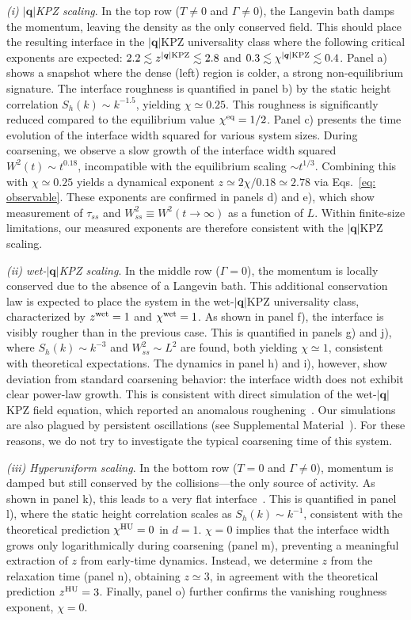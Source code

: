 \documentclass[aps,
reprint,
superscriptaddress,









amsmath,amssymb,floatfix,






prl
]{revtex4-2}
\begin{document}
\textit{(i) $|\bm q|$KPZ scaling}. In the top row ($T\neq 0$ and $\Gamma \neq 0$), the Langevin bath damps the momentum, leaving the density as the only conserved field. This should place the resulting interface in the $|\bm q|$KPZ universality class where the following critical exponents are expected: $2.2 \lesssim z^{|\bm q|\rm KPZ} \lesssim 2.8$ and $0.3 \lesssim \chi^{|\bm q|\rm KPZ} \lesssim 0.4$. Panel a) shows a snapshot where the dense (left) region is colder, a strong non-equilibrium signature. The interface roughness is quantified in panel b) by the static height correlation $S_h(k)\sim k^{-1.5}$, yielding $\chi\simeq0.25$. This roughness is significantly reduced compared to the equilibrium value $\chi^{\rm eq} = 1/2$. Panel c) presents the time evolution of the interface width squared for various system sizes. During coarsening, we observe a slow growth of the interface width squared $W^2(t)\sim t^{0.18}$, incompatible with the equilibrium scaling $\sim t^{1/3}$. Combining this with $\chi\simeq 0.25$ yields a dynamical exponent $z \simeq 2\chi/0.18 \simeq 2.78$ via Eqs.~\eqref{eq: observable}. These exponents are confirmed in panels d) and e), which show measurement of $\tau_{ss}$ and $W_{ss}^2\equiv W^2(t\to\infty)$ as a function of $L$. Within finite-size limitations, our measured exponents are therefore consistent with the $|\bm q|$KPZ scaling.

\textit{(ii) wet-$|\bm q|$KPZ scaling}. In the middle row ($\Gamma = 0$), the momentum is locally conserved due to the absence of a Langevin bath. This additional conservation law is expected to place the system in the wet-$|\bm q|$KPZ universality class, characterized by $z^{\rm wet}=1$ and $\chi^{\rm wet}=1$. As shown in panel f), the interface is visibly rougher than in the previous case. This is quantified in panels g) and j), where $S_h(k)\sim k^{-3}$ and $W_{ss}^2 \sim L^2$ are found, both yielding $\chi \simeq 1$, consistent with theoretical expectations. The dynamics in panel h) and i), however, show deviation from standard coarsening behavior: the interface width does not exhibit clear power-law growth. This is consistent with direct simulation of the wet-$|\bm q|$KPZ field equation, which reported an anomalous roughening~\cite{caballero2024interface}. Our simulations are also plagued by persistent oscillations (see Supplemental Material~\cite{supp}). For these reasons, we do not try to investigate the typical coarsening time of this system.

\textit{(iii) Hyperuniform scaling}. In the bottom row ($T=0$ and $\Gamma\neq0$), momentum is damped but still conserved by the collisions---the only source of activity. As shown in panel k), this leads to a very flat interface~\cite{maire2025hyperuniform}. This is quantified in panel l), where the static height correlation scales as $S_h(k) \sim k^{-1}$, consistent with the theoretical prediction $\chi^{\rm HU} = 0$ in $d=1$. $\chi = 0$ implies that the interface width grows only logarithmically during coarsening (panel m), preventing a meaningful extraction of $z$ from early-time dynamics. Instead, we determine $z$ from the relaxation time (panel n), obtaining $z\simeq 3$, in agreement with the theoretical prediction $z^{\rm HU} = 3$. Finally, panel o) further confirms the vanishing roughness exponent, $\chi = 0$.
\end{document}
